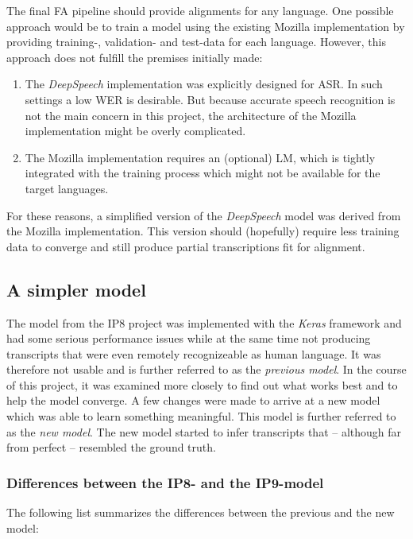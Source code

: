 The final \ac{FA} pipeline should provide alignments for any language. One possible approach would be to train a model using the existing Mozilla implementation by providing training-, validation- and test-data for each language. However, this approach does not fulfill the premises initially made:

\begin{enumerate}
	\item The \textit{DeepSpeech} implementation was explicitly designed for \ac{ASR}. In such settings a low \ac{WER} is desirable. But because accurate speech recognition is not the main concern in this project, the architecture of the Mozilla implementation might be overly complicated.
	\item The Mozilla implementation requires an (optional) \ac{LM}, which is tightly integrated with the training process which might not be available for the target languages.
\end{enumerate}

For these reasons, a simplified version of the \textit{DeepSpeech} model was derived from the Mozilla implementation. This version should (hopefully) require less training data to converge and still produce partial transcriptions fit for alignment.

\subsection{A simpler model}

The model from the IP8 project was implemented with the \textit{Keras} framework and had some serious performance issues while at the same time not producing transcripts that were even remotely recognizeable as human language. It was therefore not usable and is further referred to as the \textit{previous model}. In the course of this project, it was examined more closely to find out what works best and to help the model converge. A few changes were made to arrive at a new model which was able to learn something meaningful. This model is further referred to as the \textit{new model}. The new model started to infer transcripts that -- although far from perfect -- resembled the ground truth. 

\subsubsection{Differences between the IP8- and the IP9-model}
The following list summarizes the differences between the previous and the new model:

